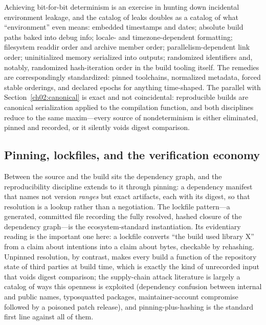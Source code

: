Achieving bit-for-bit determinism is an exercise in hunting down
incidental environment leakage, and the catalog of leaks doubles as
a catalog of what ``environment'' even means: embedded timestamps
and dates; absolute build paths baked into debug info; locale- and
timezone-dependent formatting; filesystem readdir order and archive
member order; parallelism-dependent link order; uninitialized memory
serialized into outputs; randomized identifiers and, notably,
randomized hash-iteration order in the build tooling itself. The
remedies are correspondingly standardized: pinned toolchains,
normalized metadata, forced stable orderings, and declared epochs
for anything time-shaped. The parallel with
Section~\ref{ch02:canonical} is exact and not coincidental:
reproducible builds are canonical serialization applied to the
compilation function, and both disciplines reduce to the same
maxim---every source of nondeterminism is either eliminated,
pinned and recorded, or it silently voids digest comparison.

\subsection{Pinning, lockfiles, and the verification economy}\label{ch02:repro-pinning}

Between the source and the build sits the dependency graph, and the
reproducibility discipline extends to it through pinning: a
dependency manifest that names not version \emph{ranges} but exact
artifacts, each with its digest, so that resolution is a lookup
rather than a negotiation. The lockfile pattern---a generated,
committed file recording the fully resolved, hashed closure of the
dependency graph---is the ecosystem-standard instantiation. Its
evidentiary reading is the important one here: a lockfile converts
``the build used library X'' from a claim about intentions into a
claim about bytes, checkable by rehashing. Unpinned resolution, by
contrast, makes every build a function of the repository state of
third parties at build time, which is exactly the kind of
unrecorded input that voids digest comparison; the supply-chain
attack literature is largely a catalog of ways this openness is
exploited (dependency confusion between internal and public names,
typosquatted packages, maintainer-account compromise followed by a
poisoned patch release), and pinning-plus-hashing is the standard
first line against all of them.

